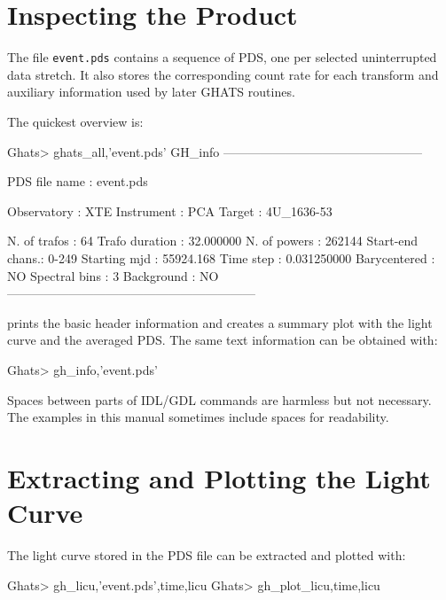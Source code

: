 \section{Inspecting the Product}

The file \texttt{event.pds} contains a sequence of PDS, one per selected
uninterrupted data stretch. It also stores the corresponding count rate for
each transform and auxiliary information used by later GHATS routines.

The quickest overview is:

\begin{ghatsconsole}
Ghats> ghats_all,'event.pds'
GH_info ------------------------------------------------

PDS file name        :        event.pds

Observatory          :        XTE
Instrument           :        PCA
Target               :        4U_1636-53

N. of trafos    :   64
Trafo duration :    32.000000
N. of powers    :   262144
Start-end chans.:   0-249
Starting mjd    :   55924.168
Time step       :   0.031250000
Barycentered    :   NO
Spectral bins   :   3
Background      :   NO
------------------------------------------------------------
\end{ghatsconsole}

 prints the basic header information and creates a summary
plot with the light curve and the averaged PDS. The same text information can
be obtained with:

\begin{ghatsconsole}
Ghats> gh_info,'event.pds'
\end{ghatsconsole}

\begin{ghatsnote}
Spaces between parts of IDL/GDL commands are harmless but not necessary. The
examples in this manual sometimes include spaces for readability.
\end{ghatsnote}

\section{Extracting and Plotting the Light Curve}

The light curve stored in the PDS file can be extracted and plotted with:

\begin{ghatsconsole}
Ghats> gh_licu,'event.pds',time,licu
Ghats> gh_plot_licu,time,licu
\end{ghatsconsole}

